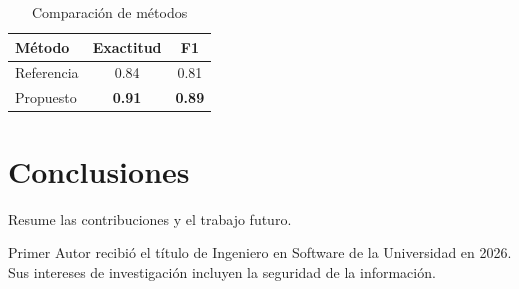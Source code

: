 \documentclass[journal]{IEEEtran}
\begin{document}
\begin{table}[!t]
  \caption{Comparación de métodos}
  \label{tab:resultados}
  \centering
  \begin{tabular}{lcc}
    \toprule
    Método & Exactitud & F1 \\
    \midrule
    Referencia & 0.84 & 0.81 \\
    Propuesto & \textbf{0.91} & \textbf{0.89} \\
    \bottomrule
  \end{tabular}
\end{table}

\section{Conclusiones}
Resume las contribuciones y el trabajo futuro.




\begin{IEEEbiographynophoto}{Primer Autor}
recibió el título de Ingeniero en Software de la Universidad en 2026. Sus intereses de
investigación incluyen la seguridad de la información.
\end{IEEEbiographynophoto}
\end{document}

